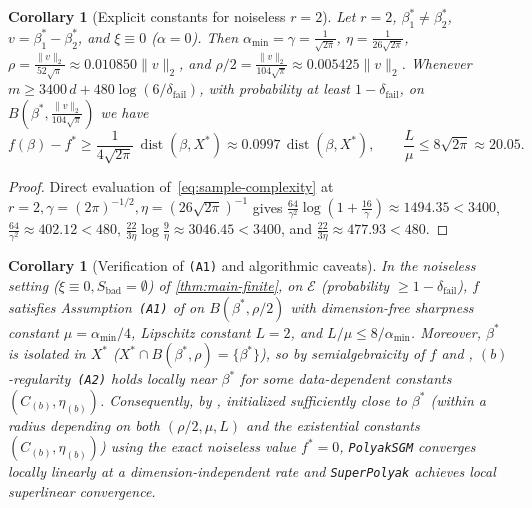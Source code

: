 \documentclass[11pt]{article}
\theoremstyle{plain}
\newtheorem{corollary}[theorem]{Corollary}
\theoremstyle{remark}
\numberwithin{equation}{section}
\newcommand{\norm}[1]{\|#1\|}
\newcommand{\dist}{\operatorname{dist}}
\begin{document}
\begin{corollary}[Explicit constants for noiseless $r = 2$]
  \label{cor:r2-explicit}
  Let $r = 2$, $\beta_1^* \ne \beta_2^*$, $v = \beta_1^* - \beta_2^*$, and $\xi \equiv 0$ ($\alpha = 0$). Then $\alpha_{\min} = \gamma = \frac{1}{\sqrt{2\pi}}$, $\eta = \frac{1}{26\sqrt{2\pi}}$, $\rho = \frac{\norm{v}_2}{52\sqrt{\pi}} \approx 0.010850\norm{v}_2$, and $\rho/2 = \frac{\norm{v}_2}{104\sqrt{\pi}} \approx 0.005425\norm{v}_2$. Whenever $m \ge 3400\,d + 480\log(6/\delta_{\mathrm{fail}})$, with probability at least $1 - \delta_{\mathrm{fail}}$, on $B(\beta^*, \frac{\norm{v}_2}{104\sqrt{\pi}})$ we have
  \[
    f(\beta) - f^* \ge \frac{1}{4\sqrt{2\pi}}\,\dist(\beta, X^*) \approx 0.0997\,\dist(\beta, X^*),
    \qquad \frac{L}{\mu} \le 8\sqrt{2\pi} \approx 20.05.
  \]
\end{corollary}
\begin{proof}
Direct evaluation of~\eqref{eq:sample-complexity} at $r = 2, \gamma = (2\pi)^{-1/2}, \eta = (26\sqrt{2\pi})^{-1}$ gives $\frac{64}{\gamma^2}\log(1 + \frac{16}{\gamma}) \approx 1494.35 < 3400$, $\frac{64}{\gamma^2} \approx 402.12 < 480$, $\frac{22}{3\eta}\log\frac{9}{\eta} \approx 3046.45 < 3400$, and $\frac{22}{3\eta} \approx 477.93 < 480$.
\end{proof}

\begin{corollary}[Verification of \cite{charisopoulos2024superpolyak} \texttt{(A1)} and algorithmic caveats]
  \label{cor:superpolyak}
  In the noiseless setting ($\xi \equiv 0, S_{\mathrm{bad}} = \emptyset$) of \cref{thm:main-finite}, on $\mathcal{E}$ (probability $\ge 1 - \delta_{\mathrm{fail}}$), $f$ satisfies Assumption~\texttt{(A1)} of \cite{charisopoulos2024superpolyak} on $B(\beta^*, \rho/2)$ with dimension-free sharpness constant $\mu = \alpha_{\min}/4$, Lipschitz constant $L = 2$, and $L/\mu \le 8/\alpha_{\min}$. Moreover, $\beta^*$ is isolated in $X^*$ ($X^* \cap B(\beta^*, \rho) = \{\beta^*\}$), so by semialgebraicity of $f$ and \cite[Proposition~2.1 and Section~5.2.2 in arXiv:2201.04611]{charisopoulos2024superpolyak}, $(b)$-regularity~\texttt{(A2)} holds locally near $\beta^*$ for some data-dependent constants $(C_{(b)}, \eta_{(b)})$. Consequently, by \cite[Theorem~2.1 and Corollary~2.3 in arXiv:2201.04611]{charisopoulos2024superpolyak}, initialized sufficiently close to $\beta^*$ (within a radius depending on both $(\rho/2, \mu, L)$ and the existential constants $(C_{(b)}, \eta_{(b)})$) using the exact noiseless value $f^* = 0$, \texttt{PolyakSGM} converges locally linearly at a dimension-independent rate and \texttt{SuperPolyak} achieves local superlinear convergence.
\end{corollary}
\end{document}
